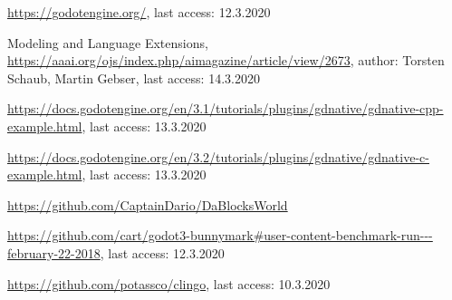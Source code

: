 \documentclass[runningheads]{llncs}
\begin{document}
    \begin{thebibliography}{8}

            \url{https://godotengine.org/},
            last access: 12.3.2020

            Modeling and Language Extensions,
            \url{https://aaai.org/ojs/index.php/aimagazine/article/view/2673},
            author: Torsten Schaub, Martin Gebser,
            last access: 14.3.2020

            \url{https://docs.godotengine.org/en/3.1/tutorials/plugins/gdnative/gdnative-cpp-example.html},
            last access: 13.3.2020

            \url{https://docs.godotengine.org/en/3.2/tutorials/plugins/gdnative/gdnative-c-example.html},
            last access: 13.3.2020

            \url{https://github.com/CaptainDario/DaBlocksWorld}

            \url{https://github.com/cart/godot3-bunnymark#user-content-benchmark-run---february-22-2018},
            last access: 12.3.2020

            \url{https://github.com/potassco/clingo},
            last access: 10.3.2020

    \end{thebibliography}
\end{document}
